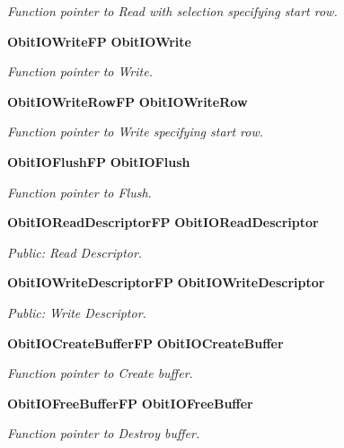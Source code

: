 \begin{CompactItemize}
\begin{CompactList}\small\item\em Function pointer to Read with selection specifying start row. \item\end{CompactList}\item 
{\bf Obit\-IOWrite\-FP} {\bf Obit\-IOWrite}
\begin{CompactList}\small\item\em Function pointer to Write. \item\end{CompactList}\item 
{\bf Obit\-IOWrite\-Row\-FP} {\bf Obit\-IOWrite\-Row}
\begin{CompactList}\small\item\em Function pointer to Write specifying start row. \item\end{CompactList}\item 
{\bf Obit\-IOFlush\-FP} {\bf Obit\-IOFlush}
\begin{CompactList}\small\item\em Function pointer to Flush. \item\end{CompactList}\item 
{\bf Obit\-IORead\-Descriptor\-FP} {\bf Obit\-IORead\-Descriptor}
\begin{CompactList}\small\item\em Public: Read Descriptor. \item\end{CompactList}\item 
{\bf Obit\-IOWrite\-Descriptor\-FP} {\bf Obit\-IOWrite\-Descriptor}
\begin{CompactList}\small\item\em Public: Write Descriptor. \item\end{CompactList}\item 
{\bf Obit\-IOCreate\-Buffer\-FP} {\bf Obit\-IOCreate\-Buffer}
\begin{CompactList}\small\item\em Function pointer to Create buffer. \item\end{CompactList}\item 
{\bf Obit\-IOFree\-Buffer\-FP} {\bf Obit\-IOFree\-Buffer}
\begin{CompactList}\small\item\em Function pointer to Destroy buffer. \item\end{CompactList}\item 

\end{CompactItemize}
